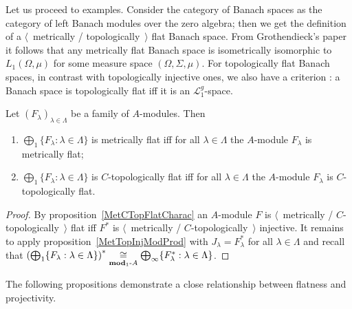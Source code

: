 Let us proceed to examples. Consider the category of Banach spaces as 
the category of left Banach modules over the zero algebra; then we get the 
definition of a $\langle$~metrically / topologically~$\rangle$ flat Banach space. 
From Grothendieck's paper~\cite{GrothMetrProjFlatBanSp} it follows that any 
metrically flat Banach space is isometrically isomorphic to $L_1(\Omega,\mu)$ 
for some measure space $(\Omega,\Sigma,\mu)$. For topologically flat Banach 
spaces, in contrast with topologically injective ones, we also have a criterion
\cite[corollary 23.5(1)]{DefFloTensNorOpId}: a Banach space is topologically
flat iff it is an $\mathscr{L}_1^g$-space.

\begin{proposition}\label{MetTopFlatModCoProd} Let
${(F_\lambda)}_{\lambda\in\Lambda}$ be a family of $A$-modules. Then 

\begin{enumerate}[label = (\roman*)]
    \item $\bigoplus_1 \{F_\lambda:\lambda\in\Lambda \}$ is metrically flat iff
    for all $\lambda\in\Lambda$ the $A$-module $F_\lambda$ is metrically flat;

    \item $\bigoplus_1 \{F_\lambda:\lambda\in\Lambda \}$ is $C$-topologically
    flat iff for all $\lambda\in\Lambda$ the $A$-module $F_\lambda$ is
    $C$-topologically flat.
\end{enumerate}
\end{proposition}
\begin{proof} By proposition~\ref{MetCTopFlatCharac} an $A$-module $F$ 
is $\langle$~metrically / $C$-topologically~$\rangle$ flat iff $F^*$ 
is $\langle$~metrically / $C$-topologically~$\rangle$ injective. 
It remains to apply
proposition~\ref{MetTopInjModProd} with $J_\lambda=F_\lambda^*$ for all
$\lambda\in\Lambda$ and recall that 
${\left(\bigoplus_1 \{
    F_\lambda:\lambda\in\Lambda \}
\right)}^*
\mathrel{\mathop{\cong}\limits_{\mathbf{mod}_1\text{-}A}}
\bigoplus_\infty \{ F_\lambda^*:\lambda\in\Lambda \}$.
\end{proof}

The following propositions demonstrate a close relationship between flatness and
projectivity.

